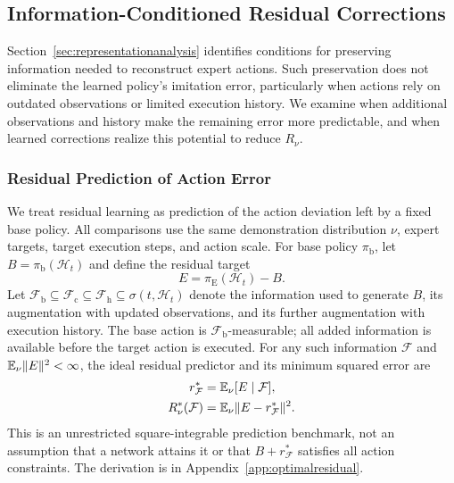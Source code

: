 \subsection{Information-Conditioned Residual Corrections}
\label{sec:feedbackanalysis}
Section~\ref{sec:representationanalysis} identifies conditions for preserving information needed to reconstruct expert actions.
Such preservation does not eliminate the learned policy's imitation error, particularly when actions rely on outdated observations or limited execution history.
We examine when additional observations and history make the remaining error more predictable, and when learned corrections realize this potential to reduce $R_\nu$.

\subsubsection{Residual Prediction of Action Error}
We treat residual learning as prediction of the action deviation left by a fixed base policy.
All comparisons use the same demonstration distribution $\nu$, expert targets, target execution steps, and action scale.
For base policy $\pi_{\mathrm b}$, let $B=\pi_{\mathrm b}(\mathcal H_t)$ and define the residual target
\begin{equation}
 E=\pi_{\mathrm E}(\mathcal H_t)-B.
 \label{eq:residualtarget}
\end{equation}
Let $\mathcal F_{\mathrm b}\subseteq\mathcal F_{\mathrm c}\subseteq\mathcal F_{\mathrm h}\subseteq\sigma(t,\mathcal H_t)$ denote the information used to generate $B$, its augmentation with updated observations, and its further augmentation with execution history.
The base action is $\mathcal F_{\mathrm b}$-measurable; all added information is available before the target action is executed.
For any such information $\mathcal F$ and $\mathbb E_\nu\lVert E\rVert^2<\infty$, the ideal residual predictor and its minimum squared error are
\begin{align}
 r_{\mathcal F}^*&=\mathbb E_\nu[E\mid\mathcal F],\nonumber\\
 R_\nu^*(\mathcal F)&=\mathbb E_\nu\lVert E-r_{\mathcal F}^*\rVert^2.
 \label{eq:optimalresidual}
\end{align}
This is an unrestricted square-integrable prediction benchmark, not an assumption that a network attains it or that $B+r_{\mathcal F}^*$ satisfies all action constraints.
The derivation is in Appendix~\ref{app:optimalresidual}.

